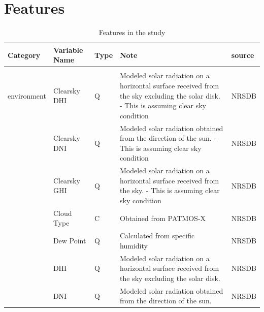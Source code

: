 \documentclass[12pt]{article}
\begin{document}
\section{Features}
{\footnotesize
\begin{longtable}{lllp{4cm}p{4cm}}
\caption{Features in the study}\\
\label{tab:feature}
Category & Variable Name & Type & Note & source \\ \hline \hline \endhead\\
environment   & Clearsky DHI               & Q    & Modeled solar radiation on a horizontal surface received from the sky excluding the solar disk. - This is assuming clear sky condition & NRSDB                                                                   \\
              & Clearsky DNI               & Q    & Modeled solar radiation obtained from the direction of the sun. - This is assuming clear sky condition                                 & NRSDB                                                                   \\
              & Clearsky GHI               & Q    & Modeled solar radiation on a horizontal surface received from the sky. - This is assuming clear sky condition                          & NRSDB                                                                   \\
              & Cloud Type                 & C    & Obtained from PATMOS-X                                                                                                                   & NRSDB                                                                   \\
              & Dew Point                  & Q    & Calculated from specific humidity                                                                                                        & NRSDB                                                                   \\
              & DHI                        & Q    & Modeled solar radiation on a horizontal surface received from the sky excluding the solar disk.                                          & NRSDB                                                                   \\
              & DNI                        & Q    & Modeled solar radiation obtained from the direction of the sun.                                                                          & NRSDB                                                                   \\

\end{longtable}}
\end{document}
